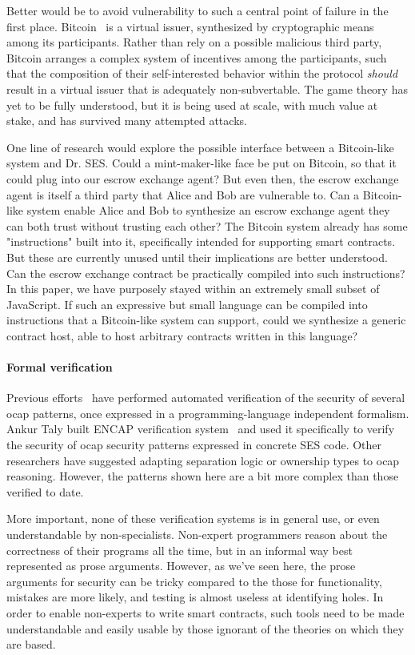 \documentclass{llncs}
\begin{document}
Better would be to avoid vulnerability to such a central point of failure in the first place. Bitcoin~\cite{nakamoto2008bitcoin} is a virtual issuer, synthesized by cryptographic means among its participants. Rather than rely on a possible malicious third party, Bitcoin arranges a complex system of incentives among the participants, such that the composition of their self-interested behavior within the protocol \emph{should} result in a virtual issuer that is adequately non-subvertable. The game theory has yet to be fully understood, but it is being used at scale, with much value at stake, and has survived many attempted attacks.

One line of research would explore the possible interface between a Bitcoin-like system and Dr. SES. Could a mint-maker-like face be put on Bitcoin, so that it could plug into our escrow exchange agent? But even then, the escrow exchange agent is itself a third party that Alice and Bob are vulnerable to. Can a Bitcoin-like system enable Alice and Bob to synthesize an escrow exchange agent they can both trust without trusting each other? The Bitcoin system already has some "instructions" built into it, specifically intended for supporting smart contracts. But these are currently unused until their implications are better understood. Can the escrow exchange contract be practically compiled into such instructions? In this paper, we have purposely stayed within an extremely small subset of JavaScript. If such an expressive but small language can be compiled into instructions that a Bitcoin-like system can support, could we synthesize a generic contract host, able to host arbitrary contracts written in this language?

\paragraph{Formal verification} 

Previous efforts~\cite{spiessens2007patterns,murray2010analysing} have performed automated verification of the security of several ocap patterns, once expressed in a programming-language independent formalism. Ankur Taly built ENCAP verification system~\cite{taly2011automated} and used it specifically to verify the security of ocap security patterns expressed in concrete SES code. Other researchers have suggested adapting separation logic or ownership types to ocap reasoning. However, the patterns shown here are a bit more complex than those verified to date.

More important, none of these verification systems is in general use, or even understandable by non-specialists. Non-expert programmers reason about the correctness of their programs all the time, but in an informal way best represented as prose arguments. However, as we've seen here, the prose arguments for security can be tricky compared to the those for functionality, mistakes are more likely, and testing is almost useless at identifying holes. In order to enable non-experts to write smart contracts, such tools need to be made understandable and easily usable by those ignorant of the theories on which they are based.






% 

\end{document}
